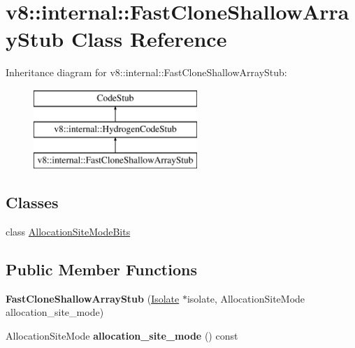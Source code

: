 \hypertarget{classv8_1_1internal_1_1_fast_clone_shallow_array_stub}{}\section{v8\+:\+:internal\+:\+:Fast\+Clone\+Shallow\+Array\+Stub Class Reference}
\label{classv8_1_1internal_1_1_fast_clone_shallow_array_stub}
Inheritance diagram for v8\+:\+:internal\+:\+:Fast\+Clone\+Shallow\+Array\+Stub\+:\begin{figure}[H]
\begin{center}
\leavevmode
\includegraphics[height=3.000000cm]{classv8_1_1internal_1_1_fast_clone_shallow_array_stub}
\end{center}
\end{figure}
\subsection*{Classes}
\begin{DoxyCompactItemize}
\item 
class \hyperlink{classv8_1_1internal_1_1_fast_clone_shallow_array_stub_1_1_allocation_site_mode_bits}{Allocation\+Site\+Mode\+Bits}
\end{DoxyCompactItemize}
\subsection*{Public Member Functions}
\begin{DoxyCompactItemize}
\item 
{\bfseries Fast\+Clone\+Shallow\+Array\+Stub} (\hyperlink{classv8_1_1internal_1_1_isolate}{Isolate} $\ast$isolate, Allocation\+Site\+Mode allocation\+\_\+site\+\_\+mode)\hypertarget{classv8_1_1internal_1_1_fast_clone_shallow_array_stub_a75d87f7d859717e1cab296cf7cc80683}{}\label{classv8_1_1internal_1_1_fast_clone_shallow_array_stub_a75d87f7d859717e1cab296cf7cc80683}

\item 
Allocation\+Site\+Mode {\bfseries allocation\+\_\+site\+\_\+mode} () const \hypertarget{classv8_1_1internal_1_1_fast_clone_shallow_array_stub_abc7195147d757a7b56f21ef191ea9c1f}{}\label{classv8_1_1internal_1_1_fast_clone_shallow_array_stub_abc7195147d757a7b56f21ef191ea9c1f}

\end{DoxyCompactItemize}
